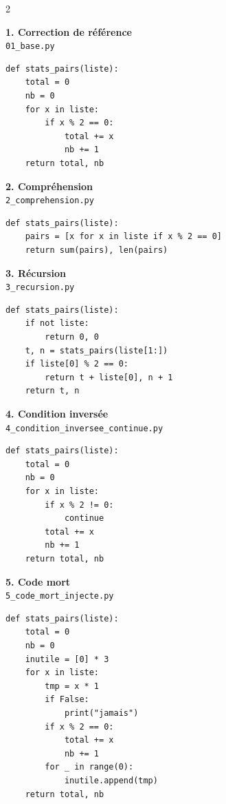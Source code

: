 \documentclass[12pt,a4paper,oneside]{report}
\begin{document}
\begin{multicols}{2}
\noindent\begin{minipage}{\linewidth}
\textbf{1. Correction de référence}\\
{\footnotesize \texttt{01\_base.py}}
\begin{lstlisting}[style=pyncst, basicstyle=\ttfamily\scriptsize, breaklines=true]
def stats_pairs(liste):
    total = 0
    nb = 0
    for x in liste:
        if x % 2 == 0:
            total += x
            nb += 1
    return total, nb
\end{lstlisting}
\end{minipage}
\medskip


\noindent\begin{minipage}{\linewidth}
\textbf{2. Compréhension}\\
{\footnotesize \texttt{2\_comprehension.py}}
\begin{lstlisting}[style=pyncst, basicstyle=\ttfamily\scriptsize, breaklines=true]
def stats_pairs(liste):
    pairs = [x for x in liste if x % 2 == 0]
    return sum(pairs), len(pairs)
\end{lstlisting}
\end{minipage}
\medskip


\noindent\begin{minipage}{\linewidth}
\textbf{3. Récursion}\\
{\footnotesize \texttt{3\_recursion.py}}
\begin{lstlisting}[style=pyncst, basicstyle=\ttfamily\scriptsize, breaklines=true]
def stats_pairs(liste):
    if not liste:
        return 0, 0
    t, n = stats_pairs(liste[1:])
    if liste[0] % 2 == 0:
        return t + liste[0], n + 1
    return t, n
\end{lstlisting}
\end{minipage}
\medskip


\noindent\begin{minipage}{\linewidth}
\textbf{4. Condition inversée}\\
{\footnotesize \texttt{4\_condition\_inversee\_continue.py}}
\begin{lstlisting}[style=pyncst, basicstyle=\ttfamily\scriptsize, breaklines=true]
def stats_pairs(liste):
    total = 0
    nb = 0
    for x in liste:
        if x % 2 != 0:
            continue
        total += x
        nb += 1
    return total, nb
\end{lstlisting}
\end{minipage}
\medskip


\noindent\begin{minipage}{\linewidth}
\textbf{5. Code mort}\\
{\footnotesize \texttt{5\_code\_mort\_injecte.py}}
\begin{lstlisting}[style=pyncst, basicstyle=\ttfamily\scriptsize, breaklines=true]
def stats_pairs(liste):
    total = 0
    nb = 0
    inutile = [0] * 3
    for x in liste:
        tmp = x * 1
        if False:
            print("jamais")
        if x % 2 == 0:
            total += x
            nb += 1
        for _ in range(0):
            inutile.append(tmp)
    return total, nb
\end{lstlisting}
\end{minipage}
\medskip



\end{multicols}
\end{document}
